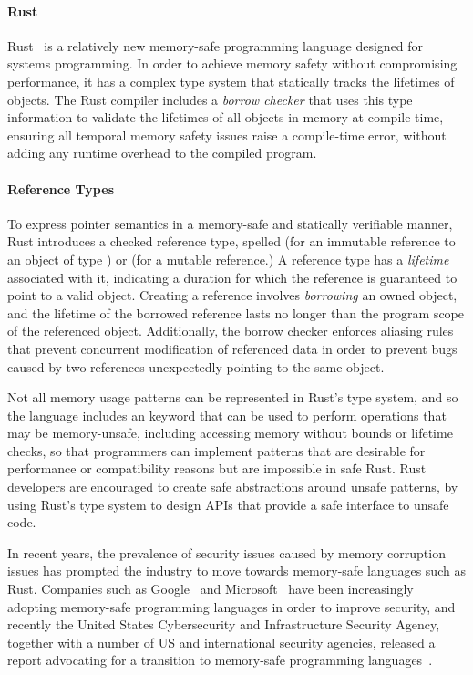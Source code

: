 \paragraph{Rust} Rust~\cite{rust} is a relatively new memory-safe programming language designed for systems
programming. In order to achieve memory safety without compromising performance, it has a complex
type system that statically tracks the lifetimes of objects. The Rust compiler includes a
\textit{borrow checker} that uses this type information to validate the lifetimes of all objects in
memory at compile time, ensuring all temporal memory safety issues raise a compile-time error,
without adding any runtime overhead to the compiled program.

\paragraph{Reference Types} To express pointer semantics in a memory-safe and statically verifiable
manner, Rust introduces a checked reference type, spelled  (for an immutable reference to an
object of type ) or  (for a mutable reference.) A reference type has a
\textit{lifetime} associated with it, indicating a duration for which the reference is guaranteed to
point to a valid object. Creating a reference involves \textit{borrowing} an owned object, and the
lifetime of the borrowed reference lasts no longer than the program scope of the referenced object.
Additionally, the borrow checker enforces aliasing rules that prevent concurrent modification of
referenced data in order to prevent bugs caused by two references unexpectedly pointing to the same
object.

Not all memory usage patterns can be represented in Rust's type system, and so the language includes
an  keyword that can be used to perform operations that may be memory-unsafe, including
accessing memory without bounds or lifetime checks, so that programmers can implement patterns that
are desirable for performance or compatibility reasons but are impossible in safe Rust. Rust
developers are encouraged to create safe abstractions around unsafe patterns, by using Rust's type
system to design APIs that provide a safe interface to unsafe code.

In recent years, the prevalence of security issues caused by memory corruption issues has prompted
the industry to move towards memory-safe languages such as Rust. Companies such as
Google~\cite{google:android-rust} and Microsoft~\cite{msrc:memory-safety} have been increasingly
adopting memory-safe programming languages in order to improve security, and recently the United
States Cybersecurity and Infrastructure Security Agency, together with a number of US and
international security agencies, released a report advocating for a transition to memory-safe
programming languages~\cite{cisa:memory-safety}.

